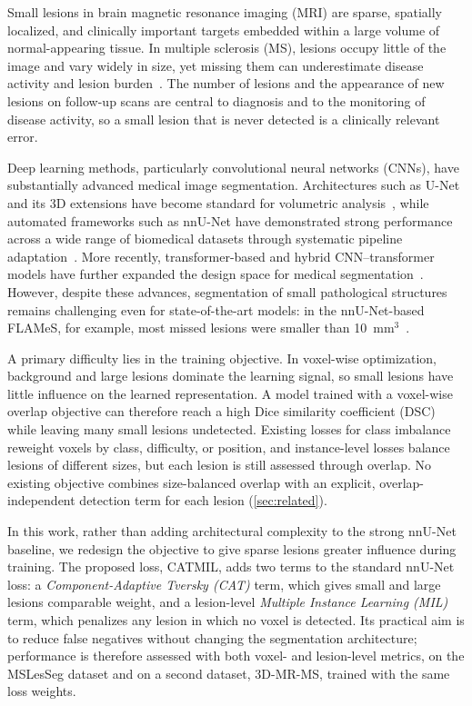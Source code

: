 Small lesions in brain magnetic resonance imaging (MRI) are sparse,
spatially localized, and clinically important targets embedded within a
large volume of normal-appearing tissue. In multiple sclerosis (MS), lesions
occupy little of the image and vary widely in size, yet missing them can
underestimate disease activity and lesion
burden~\cite{filippi_quantitative_1996,wang_survey_1997}. The number of
lesions and the appearance of new lesions on follow-up scans are central to
diagnosis and to the monitoring of disease activity, so a small lesion that
is never detected is a clinically relevant error.

Deep learning methods, particularly convolutional neural networks (CNNs),
have substantially advanced medical image segmentation. Architectures
such as U-Net and its 3D extensions have become standard for volumetric
analysis~\cite{navab_u-net_2015}, while automated frameworks such as
nnU-Net have demonstrated strong performance across a wide range of
biomedical datasets through systematic pipeline
adaptation~\cite{isensee_nnu-net_2021}. More recently, transformer-based
and hybrid CNN--transformer models have further expanded the design space
for medical segmentation~\cite{hatamizadeh_unetr_2021,
hatamizadeh_swin_2022}. However, despite these advances, segmentation of
small pathological structures remains challenging even for
state-of-the-art models: in the nnU-Net-based FLAMeS, for example, most
missed lesions were smaller than
10~mm$^3$~\cite{dereskewicz_flames_2025}.

A primary difficulty lies in the training objective. In voxel-wise
optimization, background and large lesions dominate the learning signal,
so small lesions have little influence on the learned representation. A
model trained with a voxel-wise overlap objective can therefore reach a
high Dice similarity coefficient (DSC) while leaving many small lesions
undetected. Existing losses for class imbalance reweight voxels by class,
difficulty, or position, and instance-level losses balance lesions of
different sizes, but each lesion is still assessed through overlap.
No existing objective combines size-balanced overlap with an explicit,
overlap-independent detection term for each lesion
(\cref{sec:related}).

In this work, rather than adding architectural complexity to the strong
nnU-Net baseline, we redesign the objective to give sparse lesions greater
influence during training. The proposed loss, CATMIL, adds two terms to
the standard nnU-Net loss: a \emph{Component-Adaptive Tversky (CAT)} term,
which gives small and large lesions comparable weight, and a lesion-level
\emph{Multiple Instance Learning (MIL)} term, which penalizes any lesion in
which no voxel is detected. Its practical aim is to reduce false negatives
without changing the segmentation architecture; performance is therefore
assessed with both voxel- and lesion-level metrics, on the MSLesSeg dataset
and on a second dataset, 3D-MR-MS, trained with the same loss weights.

